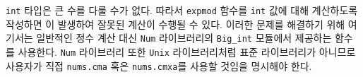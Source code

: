 
 \texttt{int} 타입은 큰 수를 다룰 수가 없다. 따라서 \texttt{expmod}
함수를 \texttt{int} 값에 대해 계산하도록 작성하면 이
발생하여 잘못된 계산이 수행될 수 있다. 이러한 문제를 해결하기 위해 여기서는
일반적인 정수 계산 대신 \texttt{Num} 라이브러리의 \texttt{Big\_int} 모듈에서
제공하는 함수를 사용한다. \texttt{Num} 라이브러리 또한 \texttt{Unix}
라이브러리처럼 표준 라이브러리가 아니므로 사용자가 직접 \texttt{nums.cma} 혹은
\texttt{nums.cmxa}를 사용할 것임을 명시해야 한다.



